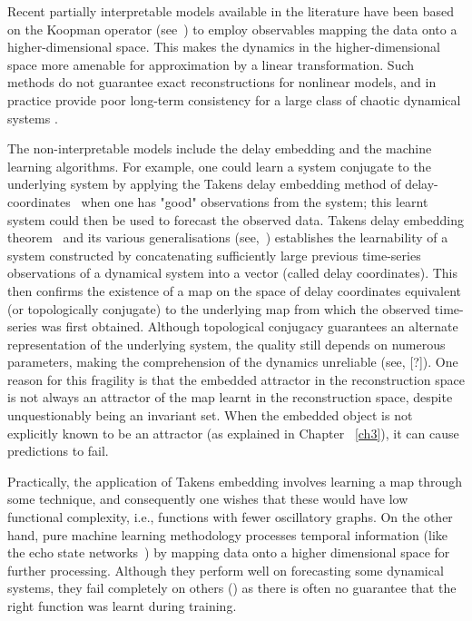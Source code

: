 Recent partially interpretable models available in the literature have been based on the Koopman operator (see~\cite{koopman1932dynamical,budivsic2012applied}) to employ observables mapping the data onto a higher-dimensional space. This makes the dynamics in the higher-dimensional space more amenable for approximation by a linear transformation. Such methods do not guarantee exact reconstructions for nonlinear models, and in practice provide poor long-term consistency for a large class of chaotic dynamical systems \cite{Supp}.

The non-interpretable models include the delay embedding and the machine learning algorithms. For example, one could learn a system conjugate to the underlying system by applying the Takens delay embedding method of delay-coordinates~\cite{takens1981detecting} when one has "good" observations from the system; this learnt system could then be used to forecast the observed data. 
Takens delay embedding theorem~\cite{takens1981detecting} and its various generalisations (see,~\cite{sauer1991embedology, stark1999delay, gutman2018embedding}) establishes the learnability of a system constructed by concatenating sufficiently large previous time-series observations of a dynamical system into a vector (called delay coordinates). This then confirms the existence of a map on the space of delay coordinates equivalent (or topologically conjugate) to the underlying map from which the observed time-series was first obtained. Although topological conjugacy guarantees an alternate representation of the underlying system, the quality still depends on numerous parameters, making the comprehension of the dynamics unreliable (see, [?]). One reason for this fragility is that the embedded attractor in the reconstruction space is not always an attractor of the map learnt in the reconstruction space, despite unquestionably being an invariant set. When the embedded object is not explicitly known to be an attractor (as explained in Chapter~ \ref{ch3}), it can cause predictions to fail.

Practically, the application of Takens embedding involves learning a map through some technique, and consequently one wishes that these would have low functional complexity\cite{manjunath2021universal}, i.e., functions with fewer oscillatory graphs. On the other hand, pure machine learning methodology processes temporal information (like the echo state networks~\cite{Manju_ESP, Manju_IEEE, grigoryeva2018echo}) by mapping data onto a higher dimensional space for further processing. Although they perform  well on forecasting some dynamical systems, they fail completely on others () as there is often no guarantee that the right function was learnt during training.

